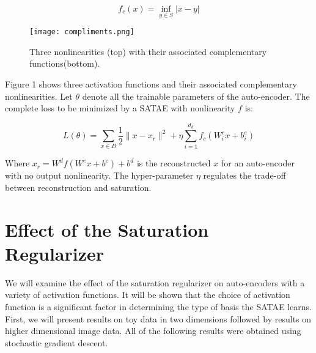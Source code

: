 \documentclass{article} %
\begin{document}
\begin{equation} f_c(x) = \inf_ {y \in S} |x-y|   
\end{equation}   

\begin{figure} \centering 
\texttt{[image: compliments.png]}
\caption{Three nonlinearities (top) with their associated complementary functions(bottom).}  
\end{figure} 

\noindent Figure 1 shows three activation functions and their associated
complementary nonlinearities. Let $\theta$ denote all the trainable parameters
of the auto-encoder. The complete loss to be minimized by a SATAE with
nonlinearity $f$ is: 

\begin{equation} 
L(\theta) = \sum_{x \in D} \frac{1}{2} \|x-x_r\|^2 + \eta \sum_{i=1}^{d_h}f_c(W^e_i x + b^e_i)
\end{equation}    

\noindent
Where $x_r = W^df(W^e x + b^e) + b^d$ is the reconstructed $x$ for an auto-encoder with no output nonlinearity. The hyper-parameter $\eta$ regulates the trade-off between reconstruction and saturation.  

\section{Effect of the Saturation Regularizer} 
We will examine the effect of the saturation regularizer on auto-encoders with
a variety of activation functions. It will be shown that the choice of
activation function is a significant factor in determining the type of basis
the SATAE learns. First, we will present results on toy data in two dimensions
followed by results on higher dimensional image data. All of the following
results were obtained using stochastic gradient descent.  
\end{document}
